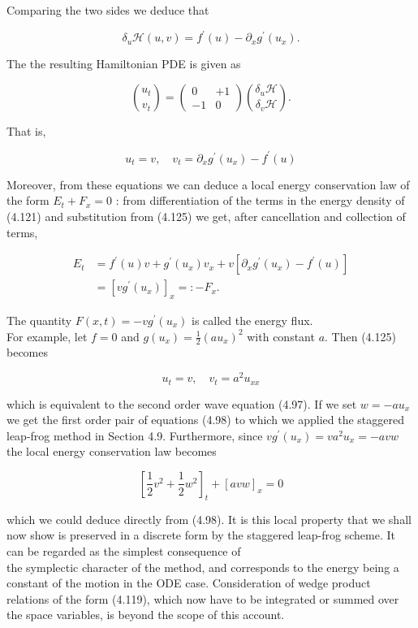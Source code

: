 \documentclass[10pt]{article}
\begin{document}
Comparing the two sides we deduce that

\[
\delta_{u} \mathcal{H}(u, v)=f^{\prime}(u)-\partial_{x} g^{\prime}\left(u_{x}\right) .
\]

The the resulting Hamiltonian PDE is given as

\[
\binom{u_{t}}{v_{t}}=\left(\begin{array}{cc}
0 & +1 \\
-1 & 0
\end{array}\right)\binom{\delta_{u} \mathcal{H}}{\delta_{v} \mathcal{H}} .
\]

That is,

\[
u_{t}=v, \quad v_{t}=\partial_{x} g^{\prime}\left(u_{x}\right)-f^{\prime}(u)
\]

Moreover, from these equations we can deduce a local energy conservation law of the form \(E_{t}+F_{x}=0\) : from differentiation of the terms in the energy density of (4.121) and substitution from (4.125) we get, after cancellation and collection of terms,

\[
\begin{aligned}
E_{t} & =f^{\prime}(u) v+g^{\prime}\left(u_{x}\right) v_{x}+v\left[\partial_{x} g^{\prime}\left(u_{x}\right)-f^{\prime}(u)\right] \\
& =\left[v g^{\prime}\left(u_{x}\right)\right]_{x}=:-F_{x} .
\end{aligned}
\]

The quantity \(F(x, t)=-v g^{\prime}\left(u_{x}\right)\) is called the energy flux.\\
For example, let \(f=0\) and \(g\left(u_{x}\right)=\frac{1}{2}\left(a u_{x}\right)^{2}\) with constant \(a\). Then (4.125) becomes

\[
u_{t}=v, \quad v_{t}=a^{2} u_{x x}
\]

which is equivalent to the second order wave equation (4.97). If we set \(w=-a u_{x}\) we get the first order pair of equations (4.98) to which we applied the staggered leap-frog method in Section 4.9. Furthermore, since \(v g^{\prime}\left(u_{x}\right)=v a^{2} u_{x}=-a v w\) the local energy conservation law becomes

\[
\left[\frac{1}{2} v^{2}+\frac{1}{2} w^{2}\right]_{t}+[a v w]_{x}=0
\]

which we could deduce directly from (4.98). It is this local property that we shall now show is preserved in a discrete form by the staggered leap-frog scheme. It can be regarded as the simplest consequence of\\
the symplectic character of the method, and corresponds to the energy being a constant of the motion in the ODE case. Consideration of wedge product relations of the form (4.119), which now have to be integrated or summed over the space variables, is beyond the scope of this account.
\end{document}
